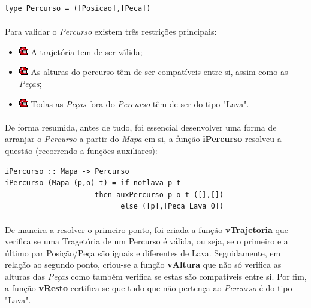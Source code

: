 \documentclass[12pt,a4paper]{report}
\begin{document}
\begin{verbatim}
type Percurso = ([Posicao],[Peca])
\end{verbatim}

\paragraph{}Para validar o \textit{Percurso} existem três restrições principais:

  \begin{itemize}
  \item[]\includegraphics[scale=0.7]{p4.png} A trajetória tem de ser válida;
  \item[]\includegraphics[scale=0.7]{p4.png} As alturas do percurso têm de ser compatíveis entre si, assim como as \textit{Peças};
  \item[]\includegraphics[scale=0.7]{p4.png} Todas as \textit{Peças} fora do \textit{Percurso} têm de ser do tipo "Lava".
  \end{itemize}

\paragraph{} De forma resumida, antes de tudo, foi essencial desenvolver uma forma de arranjar o \textit{Percurso} a partir do \textit{Mapa} em si, a função \textbf{iPercurso} resolveu a questão (recorrendo a funções auxiliares): 
 
 \begin{verbatim}
iPercurso :: Mapa -> Percurso                           
iPercurso (Mapa (p,o) t) = if notlava p t
                     then auxPercurso p o t ([],[]) 
                           else ([p],[Peca Lava 0])
 \end{verbatim}
 
\paragraph{} De maneira a resolver o primeiro ponto, foi criada a função \textbf{vTrajetoria} que verifica se uma Tragetória de um Percurso é válida, ou seja, se o primeiro e a último par Posição/Peça são iguais e diferentes de Lava.
\newline Seguidamente, em relação ao segundo ponto, criou-se a função \textbf{vAltura} que não só verifica as alturas das \textit{Peças} como também verifica se estas são compatíveis entre si.
\newline Por fim, a função \textbf{vResto} certifica-se que tudo que não pertença ao \textit{Percurso} é do tipo "Lava".
\end{document}
